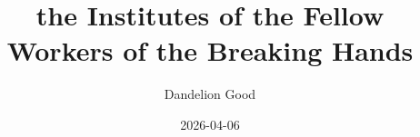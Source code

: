 

\usepackage[utf8]{inputenc}
\usepackage[english]{babel}
\usepackage[threshold=2,thresholdtype=lines]{csquotes}
\usepackage[authordate, notes, cmsdate=both, backend=biber]{biblatex-chicago}


\usepackage{fmtcount}

\newcommand{\comment}[1]{}

\newcommand{\edNote}[1]{
    \endnote
}



\pagestyle{fancy}
\fancyhf{}


\renewcommand{\thesubsection}{\Roman{chapter}.\arabic{section}:\arabic{subsection}}



\author{Dandelion Good}
\title{the Institutes of the Fellow Workers of the Breaking Hands}
\date{2026-04-06}
